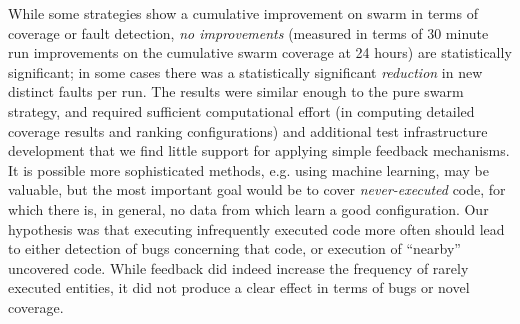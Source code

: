 While some strategies show a cumulative improvement on swarm in terms
of coverage or fault detection, \emph{no improvements} (measured in
terms of 30 minute run improvements on the cumulative swarm coverage
at 24 hours) are statistically significant; in some cases there was a
statistically significant \emph{reduction} in new distinct faults per
run.  The results were similar enough to the pure swarm strategy, and
required sufficient computational effort (in computing detailed
coverage results and ranking configurations) and additional test
infrastructure development that we find little support for applying
simple feedback mechanisms.  It is possible more sophisticated
methods, e.g. using machine learning, may be valuable, but the most
important goal would be to cover \emph{never-executed} code, for which
there is, in general, no data from which learn a good configuration.
Our hypothesis was that executing infrequently executed code more
often should lead to either detection of bugs concerning that code, or
execution of ``nearby'' uncovered code.  While feedback did indeed
increase the frequency of rarely executed entities, it did not produce
a clear effect in terms of bugs or novel coverage.
